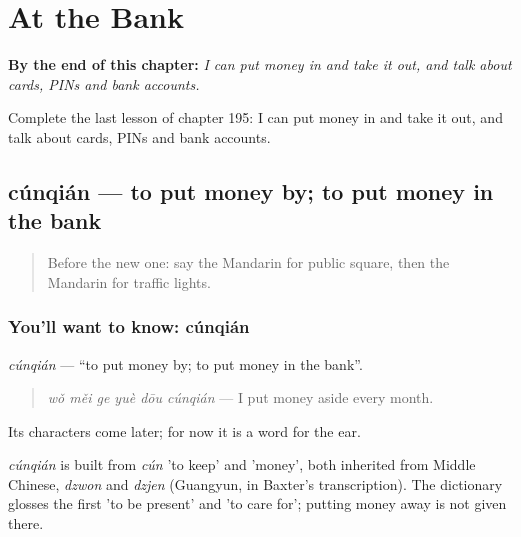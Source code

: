 
\chapter{At the Bank}
\label{ch:zh-at-the-bank}

\begin{chapteropening}
\textbf{By the end of this chapter:} \emph{I can put money in and take it out, and talk about cards, PINs and bank accounts.}

Complete the last lesson of chapter 195: I can put money in and take it out, and talk about cards, PINs and bank accounts.
\end{chapteropening}

\section[cúnqián]{cúnqián — to put money by; to put money in the bank}

\label{lesson:ZH-C195-cunqian}



\begin{quote}
Before the new one: say the Mandarin for public square, then the Mandarin for traffic lights.
\end{quote}

\subsection*{You'll want to know: cúnqián}
\emph{cúnqián} — \textquotedblleft{}to put money by; to put money in the bank\textquotedblright{}.

\begin{quote}
\emph{wǒ měi ge yuè dōu cúnqián} — I put money aside every month.
\end{quote}

Its characters come later; for now it is a word for the ear.

\begin{cousinweb}
\emph{cúnqián} is built from \emph{cún} 'to keep' and  'money', both inherited from Middle Chinese, \emph{dzwon} and \emph{dzjen} (Guangyun, in Baxter's transcription). The dictionary glosses the first 'to be present' and 'to care for'; putting money away is not given there.
\end{cousinweb}

